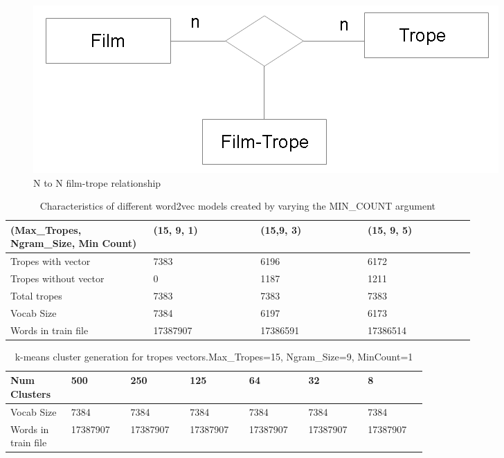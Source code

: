 \documentclass[letterpaper]{article}
\begin{document}
	   \begin{figure}
	\centering
	\includegraphics[width=1\linewidth]{../images/trope-film-n-to-n.png}
	\caption{N to N film-trope relationship}
	\label{fig:film-trope-relationship}
	\end{figure}
	
	
	
	\begin{table}[t]
	\centering
	\begin{tabular}{|p{0.24\linewidth}|p{0.18\linewidth}|p{0.18\linewidth}|p{0.18\linewidth}|}
	\hline
	\textbf{(Max\_Tropes, Ngram\_Size, Min Count)}& \textbf{(15, 9, 1)} & \textbf{(15,9, 3)} & \textbf{(15, 9, 5)}\\
	\hline
	\hline
	Tropes with vector&7383  & 6196 & 6172 \\
	\hline
	Tropes without vector& 0 & 1187 & 1211 \\
	\hline
	Total tropes&7383&7383&7383\\
	\hline
	Vocab Size& 7384 & 6197 & 6173 \\
	\hline
	Words in train file& 17387907 & 17386591 & 17386514 \\
	\hline 
	
	\end{tabular}
	\caption{Characteristics of different word2vec models created by varying the MIN\_COUNT argument}
	\label{tab:variations-with-min-count-argument-15-9}
	\end{table}    
	
	
	
	
	
	\begin{table}[ht]
	\centering
	\begin{tabular}{|p{0.1\linewidth}|p{0.1\linewidth}|p{0.1\linewidth}|p{0.1\linewidth}|p{0.1\linewidth}|p{0.1\linewidth}|p{0.1\linewidth}|}
	\hline
	\textbf{Num Clusters}& \textbf{500} & \textbf{250} & \textbf{125} & \textbf{64} & \textbf{32} & \textbf{8}\\
	\hline
	\hline
	Vocab Size& 7384 & 7384 & 7384 & 7384 & 7384 & 7384\\
	\hline
	Words in train file& 17387907 & 17387907 & 17387907 & 17387907 & 17387907 & 17387907\\
	\hline
	
	\end{tabular}
	\caption{k-means cluster generation for tropes vectors.Max\_Tropes=15, Ngram\_Size=9, MinCount=1}
	\label{tab:k-means-clusters}
	\end{table}    
	
\end{document}
